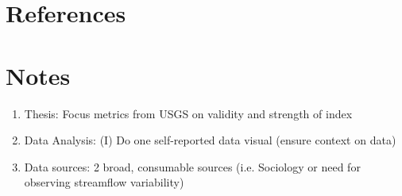 \documentclass{article}
\begin{document}
\section{References}

\section{Notes}

    \begin{enumerate}
        \item Thesis: Focus metrics from USGS on validity and strength of index
        \item Data Analysis: (I) Do one self-reported data visual (ensure context on data)
        \item Data sources: 2 broad, consumable sources (i.e. Sociology or need for observing streamflow variability)

    \end{enumerate}
\end{document}
